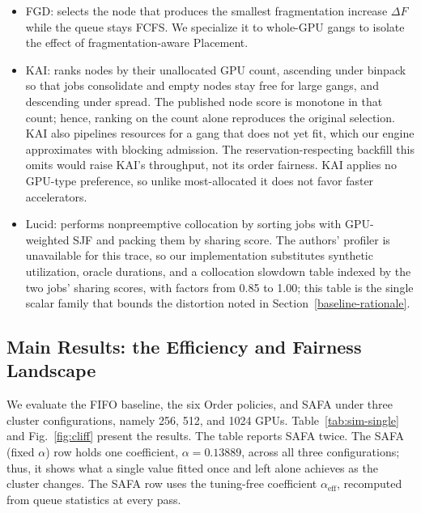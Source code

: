 \documentclass{ieeetj}
\begin{document}
\begin{itemize}
\item FGD: selects the node that produces the smallest fragmentation increase $\Delta F$ while the queue stays FCFS. We specialize it to whole-GPU gangs to isolate the effect of fragmentation-aware Placement.
\item KAI: ranks nodes by their unallocated GPU count, ascending under binpack so that jobs consolidate and empty nodes stay free for large gangs, and descending under spread. The published node score is monotone in that count; hence, ranking on the count alone reproduces the original selection. KAI also pipelines resources for a gang that does not yet fit, which our engine approximates with blocking admission. The reservation-respecting backfill this omits would raise KAI's throughput, not its order fairness. KAI applies no GPU-type preference, so unlike most-allocated it does not favor faster accelerators.
\item Lucid: performs nonpreemptive collocation by sorting jobs with GPU-weighted SJF and packing them by sharing score. The authors' profiler is unavailable for this trace, so our implementation substitutes synthetic utilization, oracle durations, and a collocation slowdown table indexed by the two jobs' sharing scores, with factors from 0.85 to 1.00; this table is the single scalar family that bounds the distortion noted in Section~\ref{baseline-rationale}.
\end{itemize}

\subsection{Main Results: the Efficiency and Fairness Landscape}\label{eval:main}
We evaluate the FIFO baseline, the six Order policies, and SAFA under three cluster configurations, namely 256, 512, and 1024 GPUs. Table~\ref{tab:sim-single} and Fig.~\ref{fig:cliff} present the results. The table reports SAFA twice. The SAFA (fixed $\alpha$) row holds one coefficient, $\alpha=0.13889$, across all three configurations; thus, it shows what a single value fitted once and left alone achieves as the cluster changes. The SAFA row uses the tuning-free coefficient $\alpha_{\text{eff}}$, recomputed from queue statistics at every pass.
\end{document}
